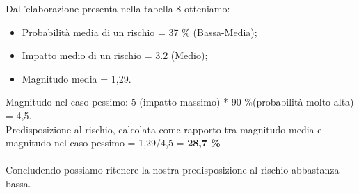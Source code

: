 	\newline
	Dall'elaborazione presenta nella tabella 8 otteniamo:
	\begin{itemize}
	    \item Probabilità media di un rischio = 37 \% (Bassa-Media);
	    \item Impatto medio di un rischio = 3.2 (Medio);
	    \item  Magnitudo media = 1,29.
	\end{itemize}
	Magnitudo nel caso pessimo: 5 (impatto massimo) * 90 \%(probabilità molto alta) = 4,5.\\
	Predisposizione al rischio, calcolata come rapporto tra magnitudo media e magnitudo nel caso pessimo = 1,29/4,5 = \textbf{ 28,7 \% }\\ \\
	Concludendo possiamo ritenere la nostra predisposizione al rischio abbastanza bassa.
